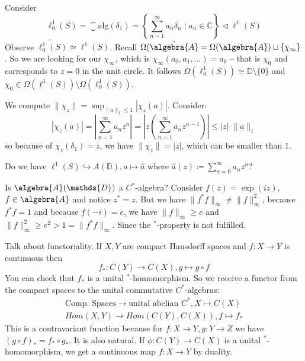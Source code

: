 \documentclass[a4paper]{article}
\begin{document}
\begin{example}[Norms $<1$]
	Consider 
	\begin{equation*}
		\ell^1_0(S) = \closure{\mathrm{alg}}(\delta_1) = \left\{ \sum_{n = 1}^{\infty} a_n \delta_n \mid a_n \in \mathds{C} \right\} \triangleleft \ell^1(S)
	\end{equation*}
	Observe $\widetilde{\ell^1_0(S)} \simeq \ell^1(S)$. Recall $\Omega(\tilde{\algebra{A}} = \Omega(\algebra{A}) \sqcup \{\chi_\infty\}$.
	So we are looking for our $\chi_\infty$, which is $\chi_\infty(a_0, a_1, \dots) = a_0$ -- that is $\chi_0$ and corresponds to $z=0$ in the unit circle.
	It follows $\Omega(\ell^1_0(S)) \simeq \mathds{D} \setminus \{ 0 \}$ and $\chi_0 \in \Omega(\ell^1(S)) \setminus \Omega(\ell^1_0(S))$. 

	We compute $\| \chi_z \| = \sup_{\|a\|_1 \leq 1} |\chi_z(a)|$. Consider:
	\begin{equation*}
		|\chi_z(a)| = \left| \sum_{n = 1}^\infty a_n z^n \right| = \left| z \left(\sum_{n=1}^{\infty} a_n z^{n-1} \right) \right| \leq |z| \cdot \| a \|_1
	\end{equation*}
	so because of $\chi_z(\delta_1) = z$, we have $\|\chi_z\| = |z|$, which can be smaller than $1$.
\end{example}

\begin{remark}
	Do we have $\ell^1(S) \hookrightarrow A(\mathds{D}), a \mapsto \hat{a}$ where $\hat{a}(z) \coloneq \sum_{n = 0}^\infty a_n z^n$?
\end{remark}

\begin{exercise}[02-03]
	Is $\algebra{A}(\mathds{D})$ a $C^*$-algebra?
	Consider $f(z) = \exp(iz)$, $f \in \algebra{A}$ and notice $z^* = z$.
	But we have $\|f^* f \|_\infty \neq \|f\|_\infty^2$, because $f^* f = 1$ and because $f(-i) = e$, we have $\|f\|_\infty \geq e$ and $\|f\|_\infty^2 \geq e^2 > 1 = \|f^* f\|_\infty$.
	Since the $^*$-property is not fulfilled.
\end{exercise}


\begin{remark}
	Talk about functoriality.
	If $X,Y$ are compact Hausdorff spaces and $f: X \to Y$ is continuous then 
	\begin{equation*}
		f_*: C(Y) \to C(X), g \mapsto g \circ f
	\end{equation*}
	You can check that $f_*$ is a unital $^*$-homomorphism. 
	So we receive a functor from the compact spaces	to the unital commutative $C^*$-algebras:
	\begin{align*}
		\text{Comp. Spaces} \to \text{unital abelian $C^*$}, X \mapsto C(X)\\
		Hom(X, Y) \to Hom(C(Y), C(X)),  f \mapsto f_*
	\end{align*}
	This is a contravariant function because for $f: X \to Y, g: Y \to Z$ we have $(g \circ f)_* = f_* \circ g_*$.
	It is also natural.
	If $\phi: C(Y) \to C(X)$ is a unital $^*$-homomorphism, we get a continuous map $f: X \to Y$ by duality.
\end{remark}
\end{document}
